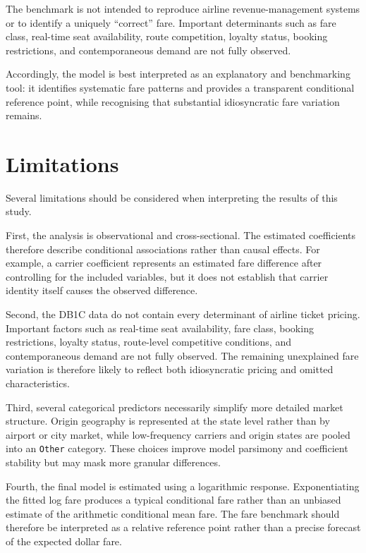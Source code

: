 \documentclass[11pt,a4paper]{article}
\begin{document}
The benchmark is not intended to reproduce airline revenue-management systems or to identify a uniquely ``correct'' fare. Important determinants such as fare class, real-time seat availability, route competition, loyalty status, booking restrictions, and contemporaneous demand are not fully observed.

Accordingly, the model is best interpreted as an explanatory and benchmarking tool: it identifies systematic fare patterns and provides a transparent conditional reference point, while recognising that substantial idiosyncratic fare variation remains.


\section{Limitations}

Several limitations should be considered when interpreting the results of this study.

First, the analysis is observational and cross-sectional. The estimated coefficients therefore describe conditional associations rather than causal effects. For example, a carrier coefficient represents an estimated fare difference after controlling for the included variables, but it does not establish that carrier identity itself causes the observed difference.

Second, the DB1C data do not contain every determinant of airline ticket pricing. Important factors such as real-time seat availability, fare class, booking restrictions, loyalty status, route-level competitive conditions, and contemporaneous demand are not fully observed. The remaining unexplained fare variation is therefore likely to reflect both idiosyncratic pricing and omitted characteristics.

Third, several categorical predictors necessarily simplify more detailed market structure. Origin geography is represented at the state level rather than by airport or city market, while low-frequency carriers and origin states are pooled into an \texttt{Other} category. These choices improve model parsimony and coefficient stability but may mask more granular differences.

Fourth, the final model is estimated using a logarithmic response. Exponentiating the fitted log fare produces a typical conditional fare rather than an unbiased estimate of the arithmetic conditional mean fare. The fare benchmark should therefore be interpreted as a relative reference point rather than a precise forecast of the expected dollar fare.
\end{document}

